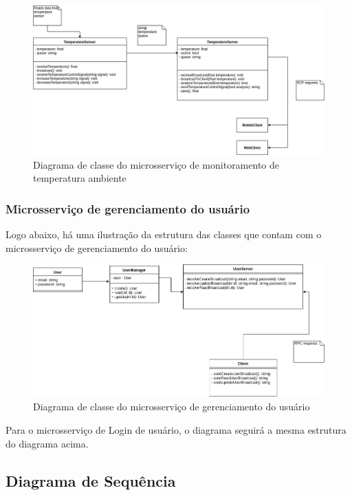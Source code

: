\begin{figure}[H]
	\centering
	\includegraphics[width=17cm]{figuras/microservico_temperatura.png}
	\caption{Diagrama de classe do microsserviço de monitoramento de temperatura ambiente} \label{microservico_temperatura}
\end{figure}

\subsubsection{Microsserviço de gerenciamento do usuário}

Logo abaixo, há uma ilustração da estrutura das classes que contam com o microsserviço de gerenciamento do usuário:

\begin{figure}[H]
	\centering
	\includegraphics[width=17cm]{figuras/microservico_usuario.png}
	\caption{Diagrama de classe do microsserviço de gerenciamento do usuário} \label{microservico_usuario}
\end{figure}

Para o microsserviço de Login de usuário, o diagrama seguirá a mesma estrutura do diagrama acima.

\subsection{Diagrama de Sequência}

